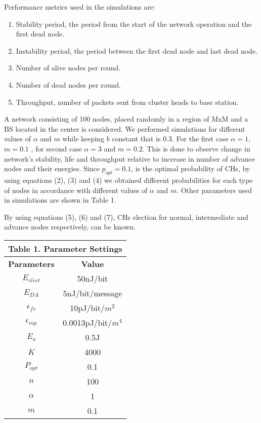 \documentclass[conference]{IEEEtran}
\begin{document}
Performance metrics used in the simulations are:\\
\begin{enumerate}
  \item Stability period, the period from the start of the network operation and the first dead node.
  \item Instability period, the period between the first dead node and last dead node.
  \item Number of alive nodes per round.
  \item Number of dead nodes per round.
  \item Throughput, number of packets sent from cluster heads to base station.\\
\end{enumerate}
	
A network consisting of 100 nodes, placed randomly in a region of MxM and a BS located in the center is considered. We performed simulations for different values of $\alpha$ and $m$ while keeping $b$ constant that is 0.3. For the first case $\alpha= 1$,$ m=0.1$ , for second case $\alpha= 3$ and $ m=0.2$. This is done to observe change in network's stability, life and throughput relative to increase in number of advance nodes and their energies. Since $p_{opt} = 0.1$, is the optimal probability of CHs, by using equations (2), (3) and (4) we obtained different probabilities for each type of nodes in accordance with different values of $\alpha$ and $m$. Other parameters used in simulations are shown in Table 1.

By using equations (5), (6) and (7), CHs election for normal, intermediate and advance nodes respectively, can be known.


\begin{table}[ht]
\centering
\begin{tabular}{|c |c |} \multicolumn{2}{c}{Table 1. Parameter Settings}\\
\hline
\textbf{ Parameters} & \textbf{Value}  \\
\hline
$ E_{elect}$ & 50nJ/bit\\
\hline                  $E_{DA}$ & 5nJ/bit/message  \\
\hline
$\epsilon_{fs} $& 10pJ/bit/$m^2$  \\
\hline
 $\epsilon_{mp} $& 0.0013pJ/bit/$m^4$    \\
\hline
 $E_o$ & 0.5J \\
 \hline
 $K$ & 4000 \\
 \hline
 $P_{opt}$ & 0.1 \\
\hline
 $n$ & 100\\
 \hline
 $\alpha$ & 1 \\
 \hline
 $m$ & 0.1 \\\hline
\end{tabular}
\end{table}
\end{document}
